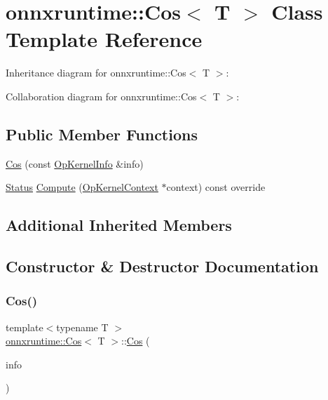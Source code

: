 \hypertarget{classonnxruntime_1_1Cos}{}\section{onnxruntime\+:\+:Cos$<$ T $>$ Class Template Reference}
\label{classonnxruntime_1_1Cos}


Inheritance diagram for onnxruntime\+:\+:Cos$<$ T $>$\+:


Collaboration diagram for onnxruntime\+:\+:Cos$<$ T $>$\+:
\subsection*{Public Member Functions}
\begin{DoxyCompactItemize}
\item 
\mbox{\hyperlink{classonnxruntime_1_1Cos_a88eb9913e11853192acfb88f065e8e64}{Cos}} (const \mbox{\hyperlink{classonnxruntime_1_1OpKernelInfo}{Op\+Kernel\+Info}} \&info)
\item 
\mbox{\hyperlink{classonnxruntime_1_1common_1_1Status}{Status}} \mbox{\hyperlink{classonnxruntime_1_1Cos_a363b9858a98d347c29935c6aa70644bb}{Compute}} (\mbox{\hyperlink{classonnxruntime_1_1OpKernelContext}{Op\+Kernel\+Context}} $\ast$context) const override
\end{DoxyCompactItemize}
\subsection*{Additional Inherited Members}


\subsection{Constructor \& Destructor Documentation}
\mbox{\label{classonnxruntime_1_1Cos_a88eb9913e11853192acfb88f065e8e64}} 
\subsubsection{\texorpdfstring{Cos()}{Cos()}}
{\footnotesize\ttfamily template$<$typename T $>$ \\
\mbox{\hyperlink{classonnxruntime_1_1Cos}{onnxruntime\+::\+Cos}}$<$ T $>$\+::\mbox{\hyperlink{classonnxruntime_1_1Cos}{Cos}} (\begin{DoxyParamCaption}\item[{const \mbox{\hyperlink{classonnxruntime_1_1OpKernelInfo}{Op\+Kernel\+Info}} \&}]{info }\end{DoxyParamCaption})\hspace{0.3cm}{\ttfamily [inline]}}



